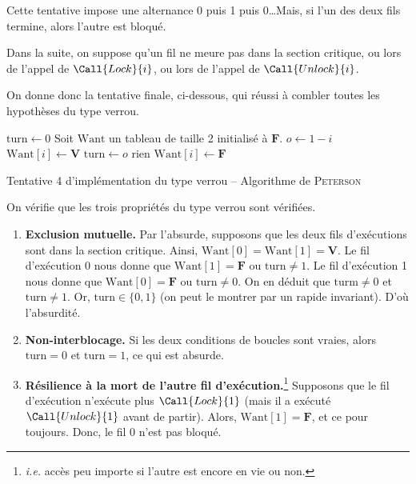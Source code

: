 Cette tentative impose une alternance 0 puis 1 puis 0\ldots\@ Mais, si l'un des deux fils termine, alors l'autre est bloqué.

Dans la suite, on suppose qu'un fil ne meure pas dans la section critique, ou lors de l'appel de $\Call{Lock}{i}$, ou lors de l'appel de $\Call{Unlock}{i}$.

On donne donc la tentative finale, ci-dessous, qui réussi à combler toutes les hypothèses du type \textsf{verrou}.

\begin{algorithm}[H]
	\centering
	\begin{algorithmic}[1]
		\State $\mathrm{turn}\gets 0$ 
		\State Soit $\mathrm{Want}$\/ un tableau de taille 2 initialisé à $\mathbf{F}$.
		\State $o \gets 1 - i$
		\State $\mathrm{Want}[i] \gets \mathbf{V}$
		\State $\mathrm{turn} \gets o$
		\State rien
		\EndWhile
		\EndProcedure
		\State $\mathrm{Want}[i] \gets \mathbf{F}$
		\EndProcedure
	\end{algorithmic}
	\caption{Tentative 4 d'implémentation du type \textsf{verrou} -- Algorithme de \textsc{Peterson}}
\end{algorithm}

On vérifie que les trois propriétés du type \textsf{verrou} sont vérifiées.
\begin{enumerate}[label=\textbf{\arabic*.}]
	\item \textbf{Exclusion mutuelle.} Par l'absurde, supposons que les deux fils d'exécutions sont dans la section critique. Ainsi, $\mathrm{Want}[0] = \mathrm{Want}[1] = \mathbf{V}$.
		Le fil d'exécution 0 nous donne que $\mathrm{Want}[1] = \mathbf{F}$ ou $\mathrm{turn} \neq 1$.
		Le fil d'exécution 1 nous donne que $\mathrm{Want}[0] = \mathbf{F}$ ou $\mathrm{turn} \neq 0$.
		On en déduit que $\mathrm{turm} \neq 0$ et $\mathrm{turn} \neq 1$.
		Or, $\mathrm{turn} \in \{0,1\}$ (on peut le montrer par un rapide invariant). D'où l'absurdité.
	\item \textbf{Non-interblocage.}
		Si les deux conditions de boucles sont vraies, alors $\mathrm{turn} = 0$ et $\mathrm{turn} = 1$, ce qui est absurde.
	\item \textbf{Résilience à la mort de l'autre fil d'exécution.}\footnote{\textit{i.e.} accès peu importe si l'autre est encore en vie ou non.}
		Supposons que le fil d'exécution n'exécute plus $\Call{Lock}{1}$ (mais il a exécuté $\Call{Unlock}{1}$ avant de partir). Alors, $\mathrm{Want}[1] = \mathbf{F}$, et ce pour toujours. Donc, le fil 0 n'est pas bloqué.
\end{enumerate}
